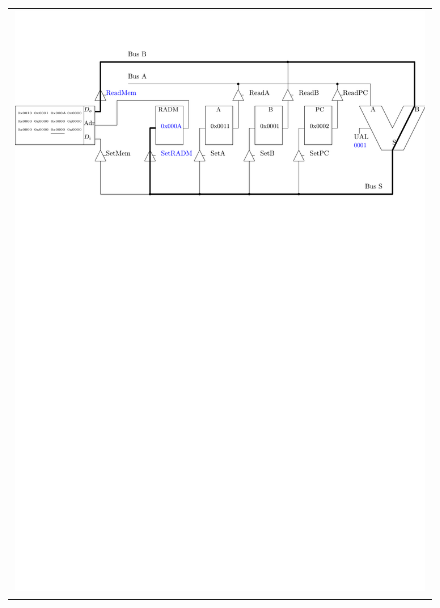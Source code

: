 \begin{figure}[htbp]
\begin{tabular}{c}
\includegraphics[width=\linewidth]{Figs/premier_chemin_sta2.pdf}\\

\end{tabular}
\end{figure}
